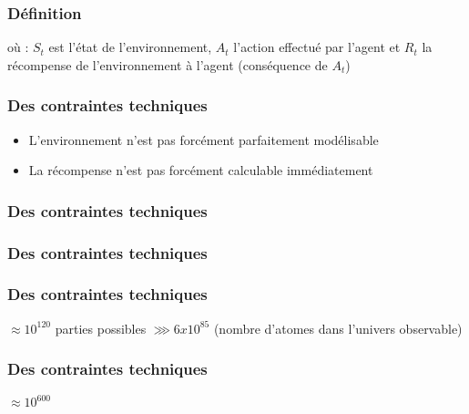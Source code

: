 \begin{frame}
  \frametitle{Définition}
  où :
  \newline
  $S_t$ est l'état de l'environnement,
  \newline
  $A_t$ l'action effectué par l'agent et
  \newline
  $R_t$ la récompense de l'environnement à l'agent (conséquence de $A_t$)
\end{frame}

\begin{frame}
  \frametitle{Des contraintes techniques}
  \begin{itemize}
  \item L'environnement n'est pas forcément parfaitement modélisable
  \item La récompense n'est pas forcément calculable immédiatement
  \end{itemize}
\end{frame}

\begin{frame}
  \frametitle{Des contraintes techniques}
\end{frame}

\begin{frame}
  \frametitle{Des contraintes techniques}
  \begin{center}
  \end{center}
\end{frame}

\begin{frame}
  \frametitle{Des contraintes techniques}
  \begin{center}
  \end{center}
  \begin{center}
    $\approx 10^{120}$ parties possibles $\ggg 6 x 10^{85}$
    \newline
    (nombre d'atomes dans l'univers observable)
  \end{center}
\end{frame}

\begin{frame}
  \frametitle{Des contraintes techniques}
  \begin{center}
    \huge{$\approx 10^{600}$}
  \end{center}
\end{frame}

